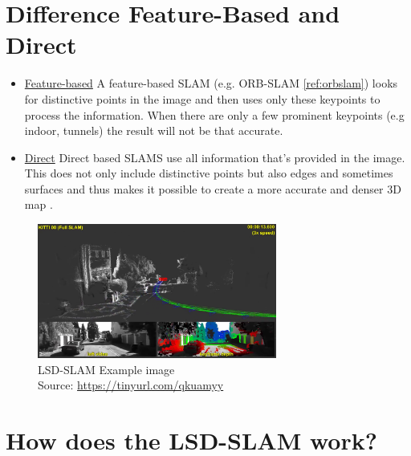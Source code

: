 \section{Difference Feature-Based and Direct}
\begin{itemize}
    \item \underline{Feature-based} \newline
        A feature-based SLAM (e.g. ORB-SLAM \ref{ref:orbslam}) looks for distinctive points in the image and then uses only these keypoints to process the information. When there are only a few prominent keypoints (e.g indoor, tunnels) the result will not be that accurate.
    \item \underline{Direct} \newline
        Direct based SLAMS use all information that's provided in the image. This does not only include distinctive points but also edges and sometimes surfaces and thus makes it possible to create a more accurate and denser 3D map \cite{lsdslam_eccv}.
\end{itemize}
\begin{figure}[h]
	\centering
	\includegraphics[width=0.7\textwidth]{./media/images/lsd-slam.png}
  	\caption{LSD-SLAM Example image
  	\\Source: \url{https://tinyurl.com/qkuamyy}}
  	\label{rosstructure}
\end{figure}

\section{How does the LSD-SLAM work?}

